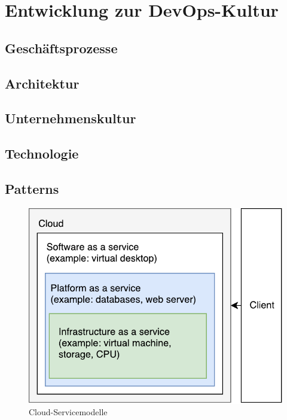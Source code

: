 \section{Entwicklung zur DevOps-Kultur}


\subsection{Geschäftsprozesse}

\subsection{Architektur}

\subsection{Unternehmenskultur}

\subsection{Technologie}

\subsection{Patterns}

\begin{figure}[h!]
	\centering
	\includegraphics[width=0.8\linewidth]{images/servicemodules.pdf}
	\caption{Cloud-Servicemodelle} %
	\label{fig:cnn_structure}
\end{figure}